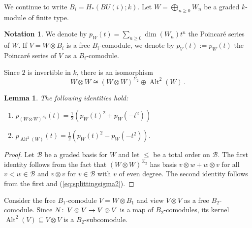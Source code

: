 \documentclass[oneside, a4paper, 12pt]{article}
\numberwithin{equation}{section}
\DeclareMathOperator{\Alt}{Alt}
\newcommand{\co}{\colon\thinspace}
\theoremstyle{plain}
\newtheorem{lemma}[theorem]{Lemma}
\theoremstyle{definition}
\newtheorem{notation}[theorem]{Notation}
\theoremstyle{remark}
\begin{document}
We continue to write $B_i=H_\ast(BU(i);k)$. Let $W=\bigoplus_{n\geq 0} W_n$ be a graded $k$-module of finite type.

\begin{notation}
We denote by $p_W(t)=\sum_{n\geq 0} \dim(W_n) t^n$ the Poincar{\'e} series of $W$. If $V=W\otimes B_i$ is a free $B_i$-comodule, we denote by $p_V(t):=p_W(t)$ the Poincar{\'e} series of $V$ as a $B_i$-comodule.
\end{notation}

Since $2$ is invertible in $k$, there is an isomorphism
\begin{equation}\label{eq:splittingsigma2}
W\otimes W\cong (W\otimes W)^{\Sigma_2} \oplus \Alt^2(W)\,.
\end{equation}

\begin{lemma}\label{lem:poincarepolynomial}
The following identities hold:
\begin{enumerate}
\item[(1)] $p_{(W\otimes W)^{\Sigma_2}}(t)=\frac{1}{2}\left( p_W(t)^2+p_W(-t^2)\right)$
\item[(2)] $p_{\Alt^2(W)}(t)=\frac{1}{2}\left(p_W(t)^2-p_W(-t^2)\right)$.
\end{enumerate}
\end{lemma}
\begin{proof}
Let $\mathcal{B}$ be a graded basis for $W$ and let $\leq$ be a total order on $\mathcal{B}$. The first identity follows from the fact that $(W\otimes W)^{\Sigma_2}$ has basis $v\otimes w+w\otimes v$ for all $v < w\in \mathcal{B}$ and $v\otimes v$ for $v\in \mathcal{B}$ with $v$ of even degree. The second identity follows from the first and (\ref{eq:splittingsigma2}).
\end{proof}


Consider the free $B_1$-comodule $V=W\otimes B_1$ and view $V\otimes V$ as a free $B_2$-comodule. Since $N\co V\otimes V\to V\otimes V$ is a map of $B_2$-comodules, its kernel $\Alt^2(V)\subseteq V\otimes V$ is a $B_2$-subcomodule.
\end{document}
